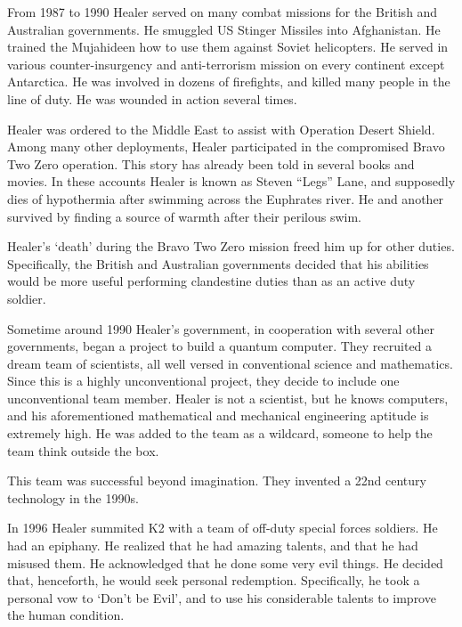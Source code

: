 From 1987 to 1990 Healer served on many combat missions for the British and Australian governments.  He smuggled US Stinger Missiles into Afghanistan. He trained the Mujahideen how to use them against Soviet helicopters.  He served in various counter-insurgency and anti-terrorism mission on every continent except Antarctica.   He was involved in dozens of firefights, and killed many people in the line of duty.   He was wounded in action several times.

Healer was ordered to the Middle East to assist with Operation Desert Shield.  Among many other deployments, Healer participated in the compromised Bravo Two Zero operation.  This story has already been told in several books and movies.  In these accounts Healer is known as Steven ``Legs'' Lane, and supposedly dies of hypothermia after swimming across the Euphrates river.  He and another survived by finding a source of warmth after their perilous swim.

Healer's `death' during the Bravo Two Zero mission freed him up for other duties.  Specifically, the British and Australian governments decided that his abilities would be more useful performing clandestine duties than as an active duty soldier.


Sometime around 1990 Healer's government, in cooperation with several other governments, began a project to build a quantum computer.   They recruited a dream team of scientists, all well versed in conventional science and mathematics.  Since this is a highly unconventional project, they decide to include one unconventional team member.   Healer is not a scientist, but he knows computers, and his aforementioned mathematical and mechanical engineering aptitude is extremely high.  He was added to the team as a wildcard, someone to help the team think outside the box.

This team was successful beyond imagination.  They invented a 22nd century technology in the 1990s.

In 1996 Healer summited K2 with a team of off-duty special forces soldiers.  He had an epiphany.  He realized that he had amazing talents, and that he had misused them.  He acknowledged that he done some very evil things.  He decided that, henceforth, he would seek personal redemption.  Specifically, he took a personal vow to `Don't be Evil', and to use his considerable talents to improve the human condition.

